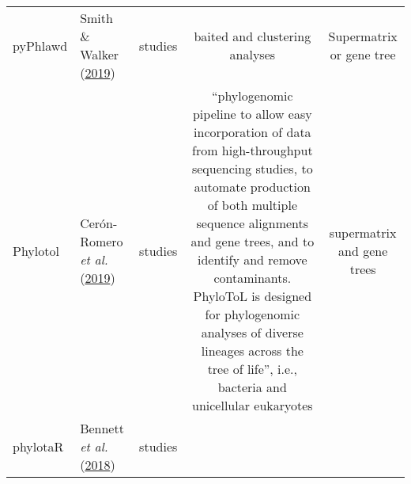 \documentclass[]{article}
\begin{document}
\begin{longtable}[]{@{}llccc@{}}
\begin{minipage}[t]{0.12\columnwidth}
pyPhlawd\strut
\end{minipage} & \begin{minipage}[t]{0.15\columnwidth}\raggedright
Smith \& Walker (\protect\hyperlink{ref-smith2019pyphlawd}{2019})\strut
\end{minipage} & \begin{minipage}[t]{0.20\columnwidth}\centering
6 studies\strut
\end{minipage} & \begin{minipage}[t]{0.20\columnwidth}\centering
baited and clustering analyses\strut
\end{minipage} & \begin{minipage}[t]{0.20\columnwidth}\centering
Supermatrix or gene tree\strut
\end{minipage}\tabularnewline
\begin{minipage}[t]{0.12\columnwidth}\raggedright
Phylotol\strut
\end{minipage} & \begin{minipage}[t]{0.15\columnwidth}\raggedright
Cerón-Romero \emph{et al.} (\protect\hyperlink{ref-ceron2019phylotol}{2019})\strut
\end{minipage} & \begin{minipage}[t]{0.20\columnwidth}\centering
5 studies\strut
\end{minipage} & \begin{minipage}[t]{0.20\columnwidth}\centering
``phylogenomic pipeline to allow easy incorporation of data from high-throughput sequencing studies, to automate production of both multiple sequence alignments and gene trees, and to identify and remove contaminants. PhyloToL is designed for phylogenomic analyses of diverse lineages across the tree of life'', i.e., bacteria and unicellular eukaryotes\strut
\end{minipage} & \begin{minipage}[t]{0.20\columnwidth}\centering
supermatrix and gene trees\strut
\end{minipage}\tabularnewline
\begin{minipage}[t]{0.12\columnwidth}\raggedright
phylotaR\strut
\end{minipage} & \begin{minipage}[t]{0.15\columnwidth}\raggedright
Bennett \emph{et al.} (\protect\hyperlink{ref-bennett2018phylotar}{2018})\strut
\end{minipage} & \begin{minipage}[t]{0.20\columnwidth}\centering
studies\strut
\end{minipage} & \begin{minipage}[t]{0.20\columnwidth}\centering
\strut
\end{minipage} & \begin{minipage}[t]{0.20\columnwidth}\centering
\strut
\end{minipage}\tabularnewline
\bottomrule
\end{longtable}
\end{document}
